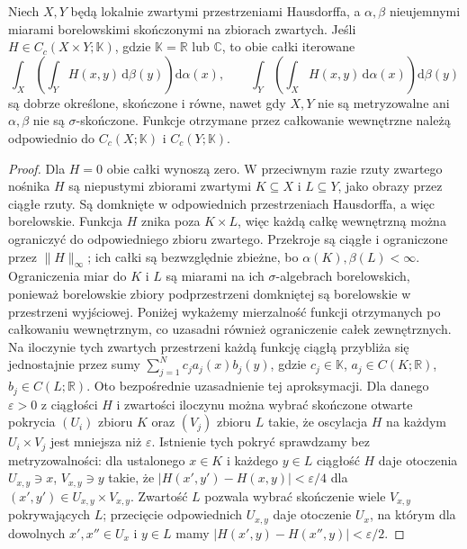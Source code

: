 \begin{lemat}
\label{lem:haar-fubini-compact-23}
Niech $X,Y$ będą lokalnie zwartymi przestrzeniami Hausdorffa,
a $\alpha,\beta$ nieujemnymi miarami borelowskimi
skończonymi na zbiorach zwartych. Jeśli
$H\in C_c(X\times Y;\mathbb K)$, gdzie
$\mathbb K=\mathbb R$ lub $\mathbb C$, to obie całki iterowane
\[
 \int_X\!\left(\int_Y H(x,y)\,\mathrm d\beta(y)\right)
 \mathrm d\alpha(x),\qquad
 \int_Y\!\left(\int_X H(x,y)\,\mathrm d\alpha(x)\right)
 \mathrm d\beta(y)
\]
są dobrze określone, skończone i równe, nawet gdy
$X,Y$ nie są metryzowalne ani $\alpha,\beta$
nie są $\sigma$-skończone. Funkcje otrzymane przez
całkowanie wewnętrzne należą odpowiednio do
$C_c(X;\mathbb K)$ i $C_c(Y;\mathbb K)$.
\end{lemat}
\begin{proof}
Dla $H=0$ obie całki wynoszą zero. W przeciwnym
razie rzuty zwartego nośnika $H$ są niepustymi
zbiorami zwartymi $K\subseteq X$ i $L\subseteq Y$,
jako obrazy przez ciągłe rzuty. Są domknięte w
odpowiednich przestrzeniach Hausdorffa, a więc
borelowskie. Funkcja $H$ znika poza $K\times L$,
więc każdą całkę wewnętrzną można ograniczyć
do odpowiedniego zbioru zwartego. Przekroje są
ciągłe i ograniczone przez $\|H\|_\infty$;
ich całki są bezwzględnie zbieżne, bo
$\alpha(K),\beta(L)<\infty$.
Ograniczenia miar do $K$ i $L$ są miarami na
ich $\sigma$-algebrach borelowskich, ponieważ
borelowskie zbiory podprzestrzeni domkniętej
są borelowskie w przestrzeni wyjściowej.
Poniżej wykażemy mierzalność funkcji otrzymanych
po całkowaniu wewnętrznym, co uzasadni również
ograniczenie całek zewnętrznych.
Na iloczynie tych zwartych przestrzeni każdą funkcję
ciągłą przybliża się jednostajnie przez sumy
$\sum_{j=1}^Nc_j a_j(x)b_j(y)$, gdzie
$c_j\in\mathbb K$, $a_j\in C(K;\mathbb R)$,
$b_j\in C(L;\mathbb R)$. Oto bezpośrednie
uzasadnienie tej aproksymacji. Dla danego $\varepsilon>0$
z ciągłości $H$ i zwartości iloczynu można wybrać
skończone otwarte pokrycia $(U_i)$ zbioru $K$ oraz
$(V_j)$ zbioru $L$ takie, że oscylacja $H$ na każdym
$U_i\times V_j$ jest mniejsza niż $\varepsilon$.
Istnienie tych pokryć sprawdzamy bez metryzowalności:
dla ustalonego $x\in K$ i każdego $y\in L$ ciągłość
$H$ daje otoczenia $U_{x,y}\ni x$, $V_{x,y}\ni y$
takie, że $|H(x',y')-H(x,y)|<\varepsilon/4$
dla $(x',y')\in U_{x,y}\times V_{x,y}$.
Zwartość $L$ pozwala wybrać skończenie wiele
$V_{x,y}$ pokrywających $L$; przecięcie
odpowiednich $U_{x,y}$ daje otoczenie $U_x$,
na którym dla dowolnych $x',x''\in U_x$ i $y\in L$
mamy $|H(x',y)-H(x'',y)|<\varepsilon/2$.

\end{proof}
